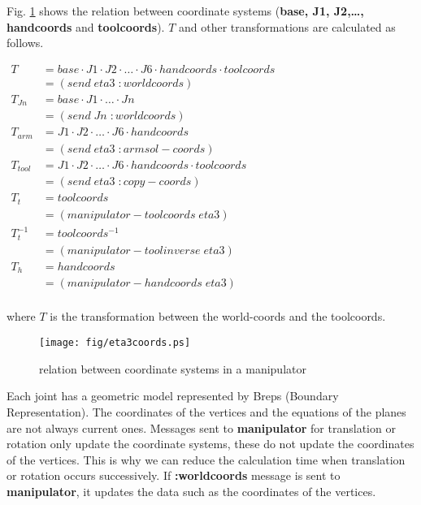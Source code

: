 Fig. \ref{JointCoords} shows the relation between coordinate systems 
({\bf base, J1, J2,\ldots , handcoords} and {\bf toolcoords}). $T$ and other 
transformations are calculated as follows.


$
\begin{array}{ll}
T & = base \cdot J1 \cdot J2 \cdot \ldots 
\cdot J6 \cdot handcoords \cdot toolcoords \\ 
 & = (send \; eta3 \; :worldcoords) \\ 
T_{Jn} & = base \cdot J1\cdot \ldots \cdot Jn \\
 & = (send \; Jn \; :worldcoords) \\
T_{arm} & = J1 \cdot J2 \cdot \ldots \cdot J6 \cdot handcoords \\ 
 & = (send \; eta3 \; :armsol-coords) \\ 
T_{tool} & = J1 \cdot J2 \cdot  \ldots \cdot J6 \cdot handcoords \cdot toolcoords \\ 
 & = (send \; eta3 \; :copy-coords) \\
T_{t} & = toolcoords \\ 
 & = (manipulator-toolcoords \; eta3)\\
T_{t}^{-1} & = toolcoords^{-1} \\ 
 & = (manipulator-toolinverse \; eta3) \\
T_{h} & = handcoords \\ 
 & = (manipulator-handcoords \; eta3)\\
\end{array}$

where $T$ is the transformation between the world-coords and the toolcoords.

\begin{figure}
\begin{center}
\texttt{[image: fig/eta3coords.ps]}
\end{center}
\caption{\label{JointCoords}
relation between coordinate systems in a manipulator}

\end{figure}

Each joint has a geometric model represented by Breps (Boundary Representation).
The coordinates of the vertices and the equations of the planes are not always 
current ones. Messages sent to {\bf manipulator} for translation or rotation only
update the coordinate systems, these do not update the coordinates of the 
vertices. This is why we can reduce the calculation time when translation or 
rotation occurs successively. If {\bf :worldcoords} message is sent to 
{\bf manipulator}, it updates the data such as the coordinates of the vertices.

